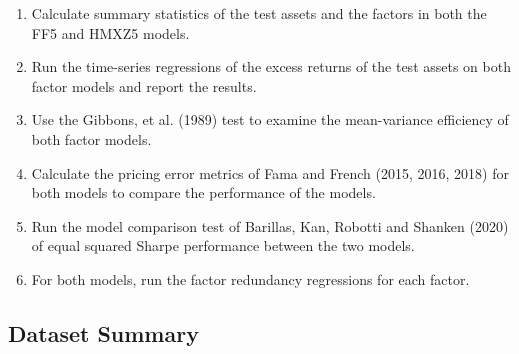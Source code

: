 \documentclass[11pt, english]{article}
\begin{document}
	\begin{enumerate}
  	\item Calculate summary statistics of the test assets and the factors in both the FF5 and HMXZ5 models. 
  	\item Run the time-series regressions of the excess returns of the test assets on both factor models and report the results.
  	\item Use the Gibbons, et al. (1989) test to examine the mean-variance efficiency of both factor models.
	\item Calculate the pricing error metrics of Fama and French (2015, 2016, 2018) for both models to compare the performance of the models.
	\item Run the model comparison test of Barillas, Kan, Robotti and Shanken (2020) of equal squared Sharpe performance between the two models.
	\item For both models, run the factor redundancy regressions for each factor.
	\end{enumerate}

	\subsection*{Dataset Summary}
\end{document}
